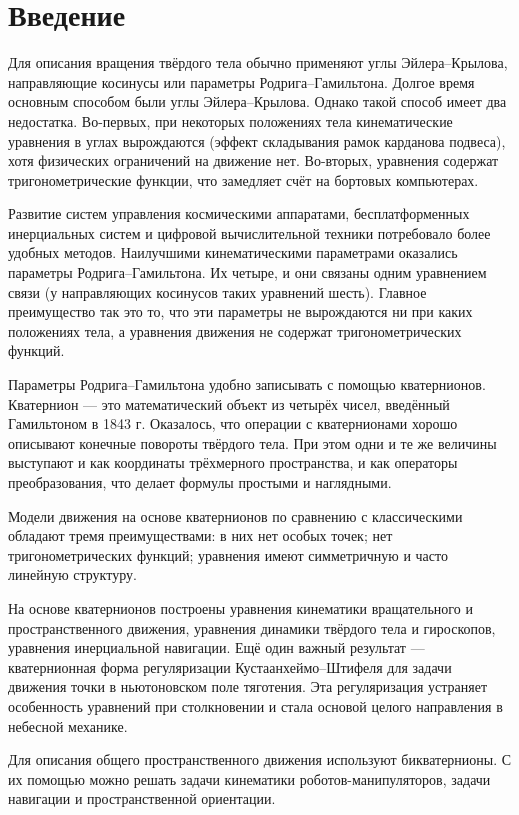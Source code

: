\chapter{Введение}

Для описания вращения твёрдого тела обычно применяют углы Эйлера–Крылова, направляющие косинусы или параметры Родрига–Гамильтона. Долгое время основным способом были углы Эйлера–Крылова. Однако такой способ имеет два недостатка. Во-первых, при некоторых положениях тела кинематические уравнения в углах вырождаются (эффект складывания рамок карданова подвеса), хотя физических ограничений на движение нет. Во-вторых, уравнения содержат тригонометрические функции, что замедляет счёт на бортовых компьютерах.

Развитие систем управления космическими аппаратами, бесплатформенных инерциальных систем и цифровой вычислительной техники потребовало более удобных методов. Наилучшими кинематическими параметрами оказались параметры Родрига–Гамильтона. Их четыре, и они связаны одним уравнением связи (у направляющих косинусов таких уравнений шесть). Главное преимущество так это то, что эти параметры не вырождаются ни при каких положениях тела, а уравнения движения не содержат тригонометрических функций.

Параметры Родрига–Гамильтона удобно записывать с помощью кватернионов. Кватернион --- это математический объект из четырёх чисел, введённый Гамильтоном в 1843 г. Оказалось, что операции с кватернионами хорошо описывают конечные повороты твёрдого тела. При этом одни и те же величины выступают и как координаты трёхмерного пространства, и как операторы преобразования, что делает формулы простыми и наглядными.

Модели движения на основе кватернионов по сравнению с классическими обладают тремя преимуществами: в них нет особых точек; нет тригонометрических функций; уравнения имеют симметричную и часто линейную структуру.

На основе кватернионов построены уравнения кинематики вращательного и пространственного движения, уравнения динамики твёрдого тела и гироскопов, уравнения инерциальной навигации. Ещё один важный результат --- кватернионная форма регуляризации Кустаанхеймо–Штифеля для задачи движения точки в ньютоновском поле тяготения. Эта регуляризация устраняет особенность уравнений при столкновении и стала основой целого направления в небесной механике.

Для описания общего пространственного движения используют бикватернионы. С их помощью можно решать задачи кинематики роботов-манипуляторов, задачи навигации и пространственной ориентации.

